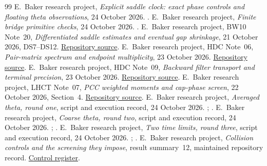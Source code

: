 \begin{thebibliography}{99}
E.~Baker research project, \emph{Explicit saddle clock: exact phase
controls and floating theta observations}, 24 October 2026.
.
E.~Baker research project, \emph{Finite bridge primitive checks},
24 October 2026.
.
E.~Baker research project, BW10 Note~20, \emph{Differentiated saddle
estimates and eventual gap shrinkage}, 21 October 2026, DS7--DS12.
\href{run:\researchroot/papers/investigations-3/13_contradiction_analysis/04_boundary_winding/threshold_routes/10_rh_implies_simple_zeros/notes/20_DIFFERENTIATED_SADDLE_AND_EVENTUAL_GAP_SHRINKAGE_20261021.md}{Repository source}.
E.~Baker research project, HDC Note~06, \emph{Pair-matrix spectrum and
endpoint multiplicity}, 23 October 2026.
\href{run:\researchroot/papers/investigations-4/12_height_dependent_heat_contours/notes/06_PAIR_MATRIX_SPECTRUM_AND_ENDPOINT_MULTIPLICITY_20261023.md}{Repository source}.
E.~Baker research project, HDC Note~09, \emph{Backward filter transport and
terminal precision}, 23 October 2026.
\href{run:\researchroot/papers/investigations-4/12_height_dependent_heat_contours/notes/09_BACKWARD_FILTER_TRANSPORT_AND_TERMINAL_PRECISION_20261023.md}{Repository source}.
E.~Baker research project, LHCT Note~07, \emph{PCC weighted moments and
cap-phase screen}, 22 October 2026, Section~4.
\href{run:\researchroot/papers/investigations-4/11_late_heat_caps_and_charge_transport/notes/07_PCC_WEIGHTED_MOMENTS_AND_CAP_PHASE_SCREEN_20261022.md}{Repository source}.
E.~Baker research project, \emph{Averaged theta, round one},
script and execution record, 24 October 2026.
;
.
E.~Baker research project, \emph{Coarse theta, round two},
script and execution record, 24 October 2026.
;
.
E.~Baker research project, \emph{Two time limits, round three},
script and execution record, 24 October 2026.
;
.
E.~Baker research project, \emph{Collision controls and the screening
they impose}, result summary~12, maintained repository record.
\href{run:\researchroot/result-summaries/12_collision_controls_and_screening.md}{Control register}.

\end{thebibliography}
